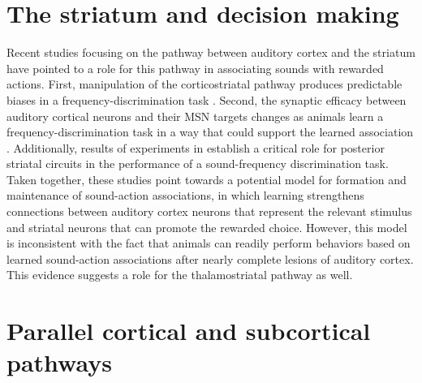 \section{The striatum and decision making}
Recent studies focusing on the pathway between auditory cortex and the striatum have pointed to a role for this pathway in associating sounds with rewarded actions.
First, manipulation of the corticostriatal pathway produces predictable biases in a frequency-discrimination task \citep{Znamenskiy2013}.
Second, the synaptic efficacy between auditory cortical neurons and their MSN targets changes as animals learn a frequency-discrimination task in a way that could support the learned association \citep{Xiong2015}.
Additionally, results of experiments in \ch{\Musc} establish a critical role for posterior striatal circuits in the performance of a sound-frequency discrimination task. 
Taken together, these studies point towards a potential model for formation and maintenance of sound-action associations, in which learning strengthens connections between auditory cortex neurons that represent the relevant stimulus and striatal neurons that can promote the rewarded choice.
%
However, this model is inconsistent with the fact that animals can readily perform behaviors based on learned sound-action associations after nearly complete lesions of auditory cortex.
%
This evidence suggests a role for the thalamostriatal pathway as well.

\section{Parallel cortical and subcortical pathways}

